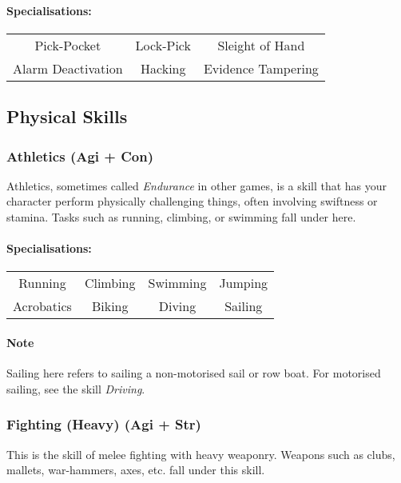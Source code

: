 \paragraph{Specialisations:}
\begin{center}
    \begin{tabular}{c|c|c}
        Pick-Pocket & Lock-Pick & Sleight of Hand \\
        Alarm Deactivation & Hacking & Evidence Tampering \\
    \end{tabular}
\end{center}

\subsection{Physical Skills}
\subsubsection{Athletics (Agi + Con)}
Athletics, sometimes called \textit{Endurance} in other games, is a skill that has your character perform physically challenging things, often involving swiftness or stamina.
Tasks such as running, climbing, or swimming fall under here.

\paragraph{Specialisations:}
\begin{center}
    \begin{tabular}{c|c|c|c}
        Running & Climbing & Swimming & Jumping \\
        Acrobatics & Biking & Diving & Sailing \\
    \end{tabular}
\end{center}

\paragraph{Note} Sailing here refers to sailing a non-motorised sail or row boat. For motorised sailing, see the skill \textit{Driving}.

\subsubsection{Fighting (Heavy) (Agi + Str)}
This is the skill of melee fighting with heavy weaponry. Weapons such as clubs, mallets, war-hammers, axes, etc. fall under this skill.

